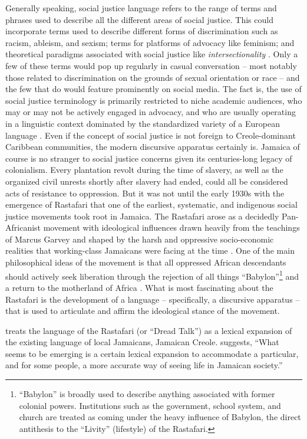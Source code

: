 \documentclass[output=paper,colorlinks,citecolor=brown]{langscibook}
\begin{document}
Generally speaking, social justice language refers to the range of terms and phrases used to describe all the different areas of social justice. This could incorporate terms used to describe different forms of discrimination such as racism, ableism, and sexism; terms for platforms of advocacy like feminism; and theoretical paradigms associated with social justice like \emph{intersectionality} \citep{HumanRightsEquityService2021}. Only a few of these terms would pop up regularly in casual conversation -- most notably those related to discrimination on the grounds of sexual orientation or race -- and the few that do would feature prominently on social media. The fact is, the use of social justice terminology is primarily restricted to niche academic audiences, who may or may not be actively engaged in advocacy, and who are usually operating in a linguistic context dominated by the standardized variety of a European language \citep{Coppola2021}. Even if the concept of social justice is not foreign to Creole-dominant Caribbean communities, the modern discursive apparatus certainly is. 
Jamaica of course is no stranger to social justice concerns given its centuries-long legacy of colonialism. Every plantation revolt during the time of slavery, as well as the organized civil unrests shortly after slavery had ended, could all be considered acts of resistance to oppression. But it was not until the early 1930s with the emergence of Rastafari that one of the earliest, systematic, and indigenous social justice movements took root in Jamaica. The Rastafari arose as a decidedly Pan-Africanist movement with ideological influences drawn heavily from the teachings of Marcus Garvey and shaped by the harsh and oppressive socio-economic realities that working-class Jamaicans were facing at the time \citep{Edmonds2012}. One of the main philosophical ideas of the movement is that all oppressed African descendants should actively seek liberation through the rejection of all things “Babylon”\footnote{“Babylon” is broadly used to describe anything associated with former colonial powers. Institutions such as the government, school system, and church are treated as coming under the heavy influence of Babylon, the direct antithesis to the “Livity” (lifestyle) of the Rastafari.} and a return to the motherland of Africa \citep{Chevannes1994}. What is most fascinating about the Rastafari is the development of a language -- specifically, a discursive apparatus -- that is used to articulate and affirm the ideological stance of the movement. 

\citet{Pollard2009} treats the language of the Rastafari (or “Dread Talk”) as a lexical expansion of the existing language of local Jamaicans, Jamaican Creole. \citet[5]{Pollard2009} suggests, “What seems to be emerging is a certain lexical expansion to accommodate a particular, and for some people, a more accurate way of seeing life in Jamaican society.”
\end{document}
